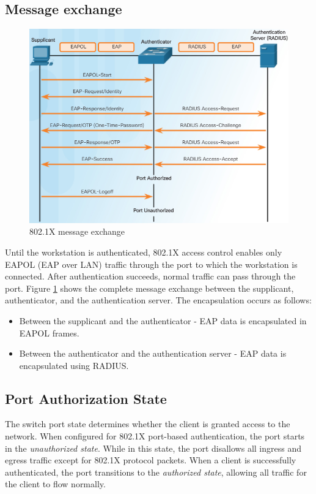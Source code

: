 \subsection{Message exchange}

\begin{figure}[hbtp]
\caption{802.1X message exchange}\label{MessageExchange}
\centering
\includegraphics[scale=0.5]{pictures/MessageExchange.PNG}
\end{figure}

Until the workstation is authenticated, 802.1X access control enables only EAPOL (EAP over LAN) traffic through the port to which the workstation is connected. After authentication succeeds, normal traffic can pass through the port. Figure \ref{MessageExchange} shows the complete message exchange between the supplicant, authenticator, and the authentication server. The encapsulation occurs as follows:

\begin{itemize}
\item Between the supplicant and the authenticator - EAP data is encapsulated in EAPOL frames.
\item Between the authenticator and the authentication server - EAP data is encapsulated using RADIUS.
\end{itemize}

\subsection{Port Authorization State}

The switch port state determines whether the client is granted access to the network. When configured for 802.1X port-based authentication, the port starts in the \emph{unauthorized state}. While in this state, the port disallows all ingress and egress traffic except for 802.1X protocol packets. When a client is successfully authenticated, the port transitions to the \emph{authorized state}, allowing all traffic for the client to flow normally. \\

